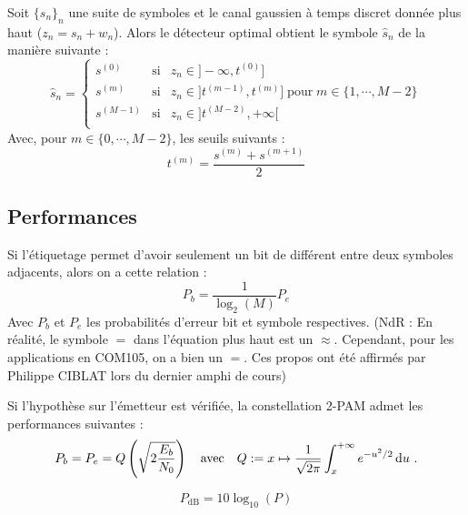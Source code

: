 	\begin{pop}
		Soit $\{s_n\}_n$ une suite de symboles et le canal gaussien à temps discret donnée plus haut ($z_{n} = s_{n} + w_{n}$). Alors le détecteur optimal obtient le symbole $\hat{s}_n$ de la manière suivante :
		$$\hat{s}_n =
		\left\{ \begin{array}{ccl}
			s^{(0)} & \text{si} & z_n\in ]-\infty ,t^{(0)}] \\
			s^{(m)} & \text{si} & z_n\in ]t^{(m-1)} ,t^{(m)}]\;\text{pour}\; m\in \{1,\cdots, M-2\} \\
                        s^{(M-1)} & \text{si} & z_n\in ]t^{(M-2)} ,+\infty[ \\
		\end{array}\right .$$
		Avec, pour $m\in \{0,\cdots,M-2\}$, les seuils suivants :
		$$t^{(m)}=\frac{s^{(m)}+s^{(m+1)}}{2}$$
	\end{pop}

\subsection{Performances}
	
	\begin{pop}
		Si l'étiquetage permet d'avoir seulement un bit de différent entre deux symboles adjacents, alors on a cette relation :
		$$P_b=\frac{1}{\log_2(M)}P_e$$
		Avec $P_b$ et $P_e$ les probabilités d'erreur bit et symbole respectives.
		(NdR : En réalité, le symbole $=$ dans l'équation plus haut est un $\approx$. Cependant, pour les applications en COM105, on a bien un $=$. Ces propos ont été affirmés par Philippe CIBLAT lors du dernier amphi de cours)
	\end{pop}	
	
	\begin{pop}
		Si l'hypothèse sur l'émetteur est vérifiée, la constellation 2-PAM admet les performances suivantes :
		$$P_b = P_e = Q \left( \sqrt{2 \frac{E_b}{N_0}} \right) \quad \text{avec} \quad Q := x \mapsto \frac{1}{\sqrt{2\pi}} \int_x^{+\infty} e^{-u^2/2} \mathop{}\mathopen{}\mathrm{d} u\ .$$
	\end{pop}
	
	$$P_\text{dB} = 10 \log_{10} (P)$$
	
	